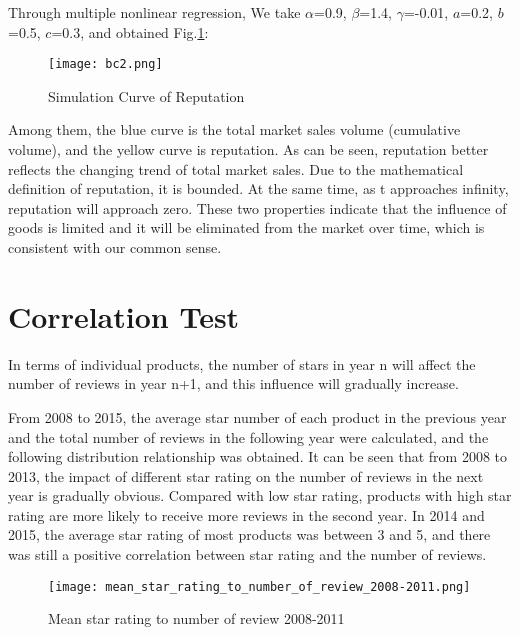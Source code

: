 \documentclass{mcmthesis}
\begin{document}
\begin{itemize}
\end{itemize}

Through multiple nonlinear regression, We take $\alpha$=0.9, $\beta$=1.4, $\gamma$=-0.01, $a$=0.2, $b$=0.5, $c$=0.3, and obtained Fig.\ref{fig:bc2}:


\begin{figure}[!h]
  \small
  \centering
  \texttt{[image: bc2.png]}
  \caption{Simulation Curve of Reputation} \label{fig:bc2}
\end{figure}



Among them, the blue curve is the total market sales volume (cumulative volume), and the yellow curve is reputation.
As can be seen, reputation better reflects the changing trend of total market sales. Due to the mathematical definition of reputation, it is bounded. At the same time, as t approaches infinity, reputation will approach zero. These two properties indicate that the influence of goods is limited and it will be eliminated from the market over time, which is consistent with our common sense.




\section{Correlation Test}

In terms of individual products, the number of stars in year n will affect the number of reviews in year n+1, and this influence will gradually increase.

From 2008 to 2015, the average star number of each product in the previous year and the total number of reviews in the following year were calculated, and the following distribution relationship was obtained. It can be seen that from 2008 to 2013, the impact of different star rating on the number of reviews in the next year is gradually obvious. Compared with low star rating, products with high star rating are more likely to receive more reviews in the second year. In 2014 and 2015, the average star rating of most products was between 3 and 5, and there was still a positive correlation between star rating and the number of reviews.

\begin{figure}[!h]
  \small
  \centering
  \texttt{[image: mean\_star\_rating\_to\_number\_of\_review\_2008-2011.png]}
  \caption{Mean star rating to number of review 2008-2011} %
\end{figure}
\end{document}
